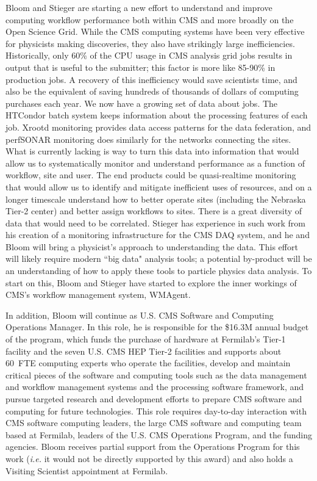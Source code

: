 Bloom and Stieger are starting a new effort to understand and improve computing workflow performance both within CMS and more broadly on the Open Science Grid.  While the CMS computing systems have been very effective for physicists making discoveries, they also have strikingly large inefficiencies.  Historically, only 60\% of the CPU usage in CMS analysis grid jobs results in output that is useful to the submitter; this factor is more like 85-90\% in production jobs.  A recovery of this inefficiency would save scientists time, and also be the equivalent of saving hundreds of thousands of dollars of computing purchases each year.  We now have a growing set of data about jobs.  The HTCondor batch system keeps information about the processing features of each job.  Xrootd monitoring provides data access patterns for the data federation, and perfSONAR monitoring does similarly for the networks connecting the sites.  What is currently lacking is way to turn this data into information that would allow us to systematically monitor and understand performance as a function of workflow, site and user.  The end products could be quasi-realtime monitoring that would allow us to identify and mitigate inefficient uses of resources, and on a longer timescale understand how to better operate sites (including the Nebraska Tier-2 center) and better assign workflows to sites.  There is a great diversity of data that would need to be correlated.  Stieger has experience in such work from his creation of a monitoring infrastructure for the CMS DAQ system, and he and Bloom will bring a physicist's approach to understanding the data.  This effort will likely require modern ``big data" analysis tools; a potential by-product will be an understanding of how to apply these tools to particle physics data analysis.  To start on this, Bloom and Stieger have started to explore the inner workings of CMS's workflow management system, WMAgent.

In addition, Bloom will continue as U.S. CMS Software and Computing Operations Manager.  In this role, he is responsible for the \$16.3M annual budget of the program, which funds the purchase of hardware at Fermilab's Tier-1 facility and the seven U.S. CMS HEP Tier-2 facilities and supports about 60~FTE computing experts who operate the facilities, develop and maintain critical pieces of the software and computing tools such as the data management and workflow management systems and the processing software framework, and pursue targeted research and development efforts to prepare CMS software and computing for future technologies.  This role requires day-to-day interaction with CMS software computing leaders, the large CMS software and computing team based at Fermilab, leaders of the U.S. CMS Operations Program, and the funding agencies.  Bloom receives partial support from the Operations Program for this work ({\it i.e.} it would not be directly supported by this award) and also holds a Visiting Scientist appointment at Fermilab.

